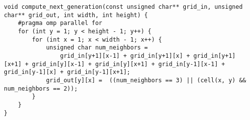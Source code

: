 \begin{lstlisting}
void compute_next_generation(const unsigned char** grid_in, unsigned char** grid_out, int width, int height) {
	#pragma omp parallel for
	for (int y = 1; y < height - 1; y++) {
		for (int x = 1; x < width - 1; x++) {
			unsigned char num_neighbors =
				grid_in[y+1][x-1] + grid_in[y+1][x] + grid_in[y+1][x+1] + grid_in[y][x-1] + grid_in[y][x+1] + grid_in[y-1][x-1] + grid_in[y-1][x] + grid_in[y-1][x+1];
			grid_out[y][x] =  ((num_neighbors == 3) || (cell(x, y) && num_neighbors == 2));
		}
	}
}
\end{lstlisting}







